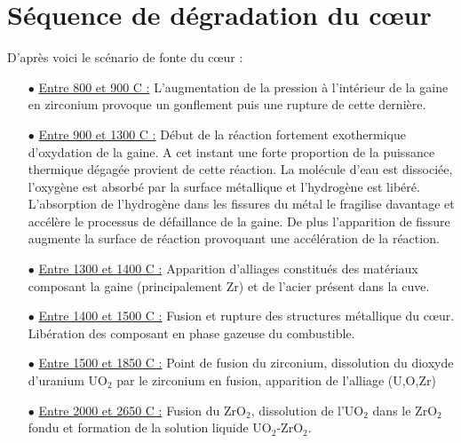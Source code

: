 \chapter{Séquence de dégradation du c\oe ur} \label{annexe:seq_deg}
D'après \cite{kolev_multiphase_2015} voici le scénario de fonte du c\oe ur :
\begin{itemize}
	\item[$\bullet$] \underline{Entre 800 et 900 \textdegree C :} L'augmentation de la pression à l'intérieur de la gaine en zirconium provoque un gonflement puis une rupture de cette dernière.
	\item[$\bullet$] \underline{Entre 900 et 1300 \textdegree C :} Début de la réaction fortement exothermique d'oxydation de la gaine. A cet instant une forte proportion de la puissance thermique dégagée provient de cette réaction. La molécule d'eau est dissociée, l'oxygène est absorbé par la surface métallique et l'hydrogène est libéré. L'absorption de l'hydrogène dans les fissures du métal le fragilise davantage et accélère le processus de défaillance de la gaine. De plus l'apparition de fissure augmente la surface de réaction provoquant une accélération de la réaction.
	\item[$\bullet$] \underline{Entre 1300 et 1400 \textdegree C :} Apparition d'alliages constitués des matériaux composant la gaine (principalement Zr) et de l'acier présent dans la cuve.
	\item[$\bullet$] \underline{Entre 1400 et 1500 \textdegree C :} Fusion et rupture des structures métallique du c\oe ur. Libération des composant en phase gazeuse du combustible.
	\item[$\bullet$] \underline{Entre 1500 et 1850 \textdegree C :} Point de fusion du zirconium, dissolution du dioxyde d'uranium UO$_2$ par le zirconium en fusion, apparition de l'alliage (U,O,Zr)
	\item[$\bullet$] \underline{Entre 2000 et 2650 \textdegree C :} Fusion du ZrO$_2$, dissolution de l'UO$_2$ dans le ZrO$_2$ fondu et formation de la solution liquide UO$_2$-ZrO$_2$.
\end{itemize}
